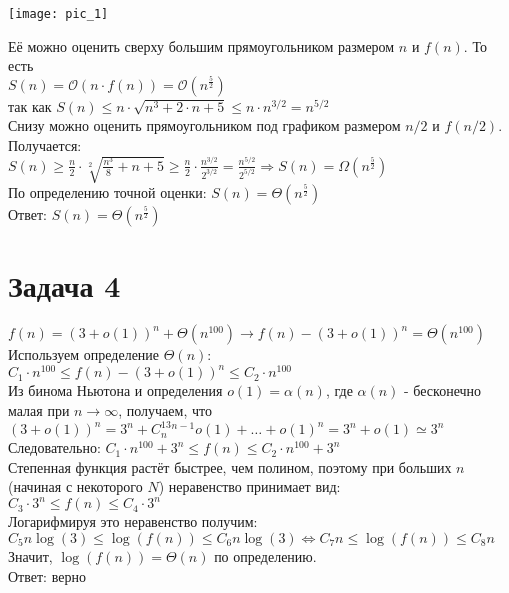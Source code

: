 \documentclass[a4paper,12pt]{article} %
\begin{document}
\begin{center}
\texttt{[image: pic\_1]}
\end{center}
Её можно оценить сверху большим прямоугольником размером $ n $ и $f(n)$. То есть\\
$ S(n) = \mathcal{O}(n \cdot f(n)) = \mathcal{O}(n^{\frac{5}{2}})$\\ так как $ S(n) \leq n \cdot \sqrt{n^{3}+2 \cdot n+5} \leq n \cdot n^{3 / 2}=n^{5 / 2} $\\
Снизу можно оценить прямоугольником под графиком размером 
$ n/2 $ и $f(n/2)$. Получается:\\
$ S(n) \geqslant \frac{n}{2} \cdot \sqrt[2]{\frac{n^{3}}{8}+n+5} \geqslant \frac{n}{2} \cdot \frac{n^{3 / 2}}{2^{3 / 2}}=\frac{n^{5 / 2}}{2^{5 / 2}} \Rightarrow 
S(n) = \Omega(n^{\frac{5}{2}})$\\
По определению точной оценки: $S(n) = \Theta(n^{\frac{5}{2}})$\\
Ответ: $S(n) = \Theta(n^{\frac{5}{2}})$

\section*{Задача 4}
$ f(n)=(3+o(1))^{n}+\Theta\left(n^{100}\right) \rightarrow
f(n)-(3+o(1))^{n}=\Theta\left(n^{100}\right)$\\
Используем определение $ \Theta(n) $:\\
$ C_{1} \cdot n^{100} \leq f(n)-(3+o(1))^{n} \leq C_{2} \cdot n^{100} $\\
Из бинома Ньютона и определения $ o(1) = \alpha(n) $, где $ \alpha(n) $ - бесконечно малая при $ n\rightarrow \infty $, получаем, что\\
$ (3+o(1))^{n} = 3^n + C_n^13^{n-1}o(1) + \ldots + o(1)^n = 
3^n + o(1) \simeq 3^n $\\
Следовательно: $ C_{1} \cdot n^{100}+3^{n} \leq f(n) \leq C_{2} \cdot n^{100}+3^{n} $\\
Степенная функция растёт быстрее, чем полином, поэтому при больших $ n $ (начиная с некоторого $ N $) неравенство принимает вид:\\
$ C_{3} \cdot 3^{n} \leq f(n) \leq C_{4} \cdot 3^{n} $\\
Логарифмируя это неравенство получим:\\
$ C_{5}n \log (3) \leq \log (f(n)) \leq C_{6}n \log (3) \Leftrightarrow
C_{7}n \leq \log (f(n)) \leq C_{8}n $\\
Значит, $ \log (f(n)) = \Theta(n) $ по определению.\\
Ответ: верно
\end{document}
